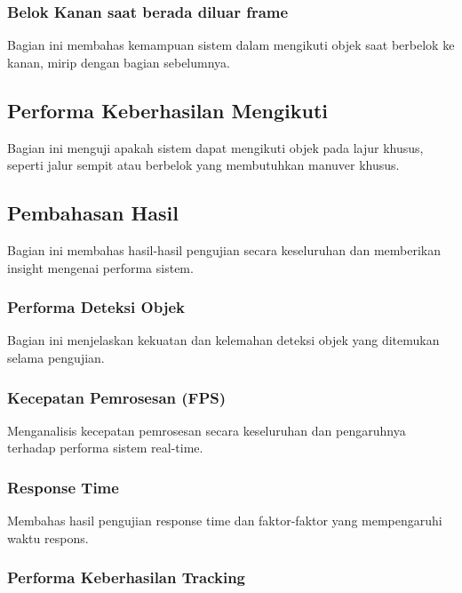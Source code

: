 \subsubsection{Belok Kanan saat berada diluar frame}
\label{subsubsec:belokkananluarframe}

Bagian ini membahas kemampuan sistem dalam mengikuti objek saat berbelok ke kanan, mirip dengan bagian sebelumnya.

\subsection{Performa Keberhasilan Mengikuti}
\label{subsec:performamengikuti}

Bagian ini menguji apakah sistem dapat mengikuti objek pada lajur khusus, seperti jalur sempit atau berbelok yang membutuhkan manuver khusus.

\subsection{Pembahasan Hasil}
\label{subsec:pembahasanhasil}

Bagian ini membahas hasil-hasil pengujian secara keseluruhan dan memberikan insight mengenai performa sistem.

\subsubsection{Performa Deteksi Objek}
\label{subsec:performadeteksiobjek}

Bagian ini menjelaskan kekuatan dan kelemahan deteksi objek yang ditemukan selama pengujian.

\subsubsection{Kecepatan Pemrosesan (FPS)}
\label{subsec:kecepatanpemrosesan}

Menganalisis kecepatan pemrosesan secara keseluruhan dan pengaruhnya terhadap performa sistem real-time.

\subsubsection{Response Time}
\label{subsec:responsetime}

Membahas hasil pengujian response time dan faktor-faktor yang mempengaruhi waktu respons.

\subsubsection{Performa Keberhasilan Tracking}
\label{subsec:performatracking}

